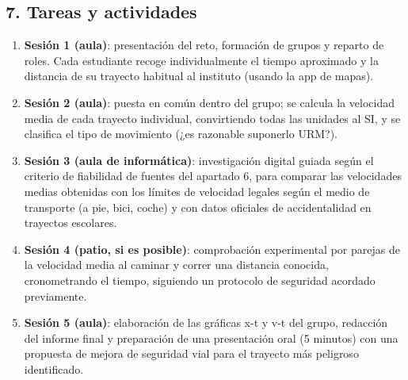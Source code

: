 \documentclass[11pt,a4paper]{article}
\begin{document}
\subsection*{7. Tareas y actividades}
\begin{enumerate}
    \item \textbf{Sesión 1 (aula)}: presentación del reto, formación de grupos y reparto de roles. Cada estudiante recoge individualmente el tiempo aproximado y la distancia de su trayecto habitual al instituto (usando la app de mapas).
    \item \textbf{Sesión 2 (aula)}: puesta en común dentro del grupo; se calcula la velocidad media de cada trayecto individual, convirtiendo todas las unidades al SI, y se clasifica el tipo de movimiento (¿es razonable suponerlo URM?).
    \item \textbf{Sesión 3 (aula de informática)}: investigación digital guiada según el criterio de fiabilidad de fuentes del apartado 6, para comparar las velocidades medias obtenidas con los límites de velocidad legales según el medio de transporte (a pie, bici, coche) y con datos oficiales de accidentalidad en trayectos escolares.
    \item \textbf{Sesión 4 (patio, si es posible)}: comprobación experimental por parejas de la velocidad media al caminar y correr una distancia conocida, cronometrando el tiempo, siguiendo un protocolo de seguridad acordado previamente.
    \item \textbf{Sesión 5 (aula)}: elaboración de las gráficas x-t y v-t del grupo, redacción del informe final y preparación de una presentación oral (5 minutos) con una propuesta de mejora de seguridad vial para el trayecto más peligroso identificado.
\end{enumerate}
\end{document}
